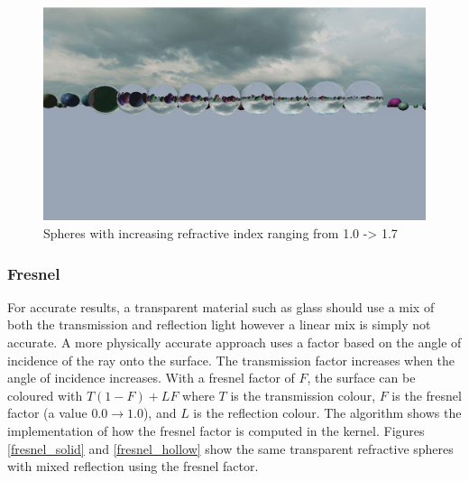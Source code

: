 \documentclass[final]{cmpreport}
\begin{document}
\begin{figure}
    \centering
    \includegraphics[width=\textwidth]{img/refractive_index.png}
    \caption{Spheres with increasing refractive index ranging from 1.0 -> 1.7}
    \label{spheres_refractive_index}
\end{figure}

\subsubsection{Fresnel}

For accurate results, a transparent material such as glass should use a mix of both the transmission and reflection light however a linear mix is simply not accurate. A more physically accurate approach uses a factor based on the angle of incidence of the ray onto the surface. The transmission factor increases when the angle of incidence increases. With a fresnel factor of $F$, the surface can be coloured with $T(1 - F) + LF$ where $T$ is the transmission colour, $F$ is the fresnel factor (a value $0.0 \rightarrow 1.0$), and $L$ is the reflection colour. The algorithm  shows the implementation of how the fresnel factor is computed in the kernel. Figures \ref{fresnel_solid} and \ref{fresnel_hollow} show the same transparent refractive spheres with mixed reflection using the fresnel factor.
\end{document}
